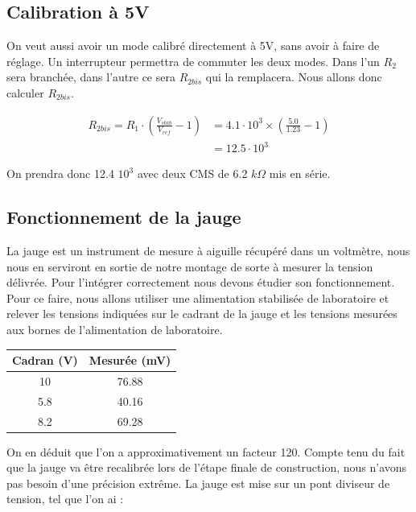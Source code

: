 \documentclass[12pt]{article}
\begin{document}
\subsection{Calibration à 5V}\label{calcul5V}

On veut aussi avoir un mode calibré directement à 5V, sans avoir à faire de réglage. Un interrupteur permettra de
commuter les deux modes. Dans l'un  $R_2$ sera branchée, dans l'autre ce sera $R_{2bis}$ qui la remplacera. Nous
allons donc calculer $R_{2bis}$.

\begin{equation}
	\begin{split}
		R_{2bis} = R_1 \cdot ( \frac{V_{stab}}{V_{ref}} - 1)& = 4.1 \cdot 10^3 \times (\frac{5.0}{1.23} - 1) \\
									& = 12.5 \cdot 10^3
	\end{split}
\end{equation}

On prendra donc 12.4 $10^3$ avec deux CMS de 6.2 $k\Omega$ mis en série.


\subsection{Fonctionnement de la jauge}

La jauge est un instrument de mesure à aiguille récupéré dans un voltmètre, nous nous en serviront en sortie de notre 
montage de sorte à mesurer la tension délivrée. Pour l'intégrer correctement nous devons étudier son fonctionnement.
Pour ce faire, nous allons utiliser une alimentation stabilisée de laboratoire et relever les tensions indiquées 
sur le cadrant de la jauge et les tensions mesurées aux bornes de l'alimentation de laboratoire.

\begin{center}
	\begin{tabular}{|c|c|}
		\hline
		Cadran (V)	& Mesurée (mV) \\ \hline
		10		& 76.88		\\
		5.8		& 40.16		\\
		8.2		& 69.28		\\
		\hline
	\end{tabular}
\end{center}

On en déduit que l'on a approximativement un facteur 120. Compte tenu du fait que la jauge va être recalibrée lors
de l'étape finale de construction, nous n'avons pas besoin d'une précision extrême. La jauge est mise sur un pont diviseur
de tension, tel que l'on ai :
\end{document}
